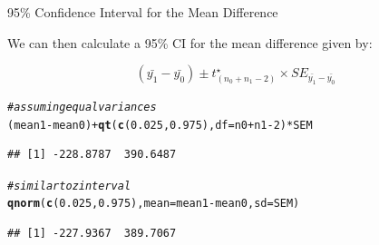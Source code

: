 \documentclass[handout]{beamer}\usepackage[]{graphicx}\usepackage[]{color}
\newcommand{\hlnum}[1]{\textcolor[rgb]{0.686,0.059,0.569}{#1}}%
\newcommand{\hlcom}[1]{\textcolor[rgb]{0.678,0.584,0.686}{\textit{#1}}}%
\newcommand{\hlopt}[1]{\textcolor[rgb]{0,0,0}{#1}}%
\newcommand{\hlstd}[1]{\textcolor[rgb]{0.345,0.345,0.345}{#1}}%
\newcommand{\hlkwc}[1]{\textcolor[rgb]{0.333,0.667,0.333}{#1}}%
\newcommand{\hlkwd}[1]{\textcolor[rgb]{0.737,0.353,0.396}{\textbf{#1}}}%
\newenvironment{knitrout}{}{} %
\begin{document}
\begin{frame}[fragile]{95\% Confidence Interval for the Mean Difference}

We can then calculate a 95\% CI for the mean difference given by:

\begin{equation}
(\bar{y_1} - \bar{y_0}) \pm t^\star_{(n_0 + n_1 - 2)} \times SE_{\bar{y_1} - \bar{y_0}}
\end{equation}

\pause 

\begin{knitrout}\scriptsize
{}\color{fgcolor}
\begin{alltt}
\hlcom{# assuming equal variances}
\hlstd{(mean1} \hlopt{-} \hlstd{mean0)} \hlopt{+} \hlkwd{qt}\hlstd{(}\hlkwd{c}\hlstd{(}\hlnum{0.025}\hlstd{,} \hlnum{0.975}\hlstd{),} \hlkwc{df} \hlstd{= n0} \hlopt{+} \hlstd{n1} \hlopt{-} \hlnum{2}\hlstd{)} \hlopt{*} \hlstd{SEM}
\end{alltt}
\begin{verbatim}
## [1] -228.8787  390.6487
\end{verbatim}
\begin{alltt}
\hlcom{# similar to z interval}
\hlkwd{qnorm}\hlstd{(}\hlkwd{c}\hlstd{(}\hlnum{0.025}\hlstd{,} \hlnum{0.975}\hlstd{),} \hlkwc{mean} \hlstd{= mean1} \hlopt{-} \hlstd{mean0,} \hlkwc{sd} \hlstd{= SEM)}
\end{alltt}
\begin{verbatim}
## [1] -227.9367  389.7067
\end{verbatim}

\end{knitrout}


\end{frame}
\end{document}
